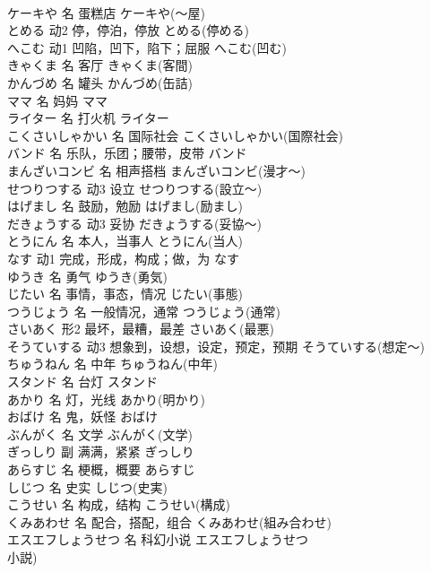 \documentclass[8pt]{extreport}
\begin{document}
\begin{CJK}{UTF8}{min}
\\	ケーキや	名	蛋糕店	ケーキや(～屋)	
\\	とめる	动2	停，停泊，停放	とめる(停める)	
\\	へこむ	动1	凹陷，凹下，陷下；屈服	へこむ(凹む)	
\\	きゃくま	名	客厅	きゃくま(客間)	
\\	かんづめ	名	罐头	かんづめ(缶詰)	
\\	ママ	名	妈妈	ママ	
\\	ライター	名	打火机	ライター	
\\	こくさいしゃかい	名	国际社会	こくさいしゃかい(国際社会)	
\\	バンド	名	乐队，乐团；腰带，皮带	バンド	
\\	まんざいコンビ	名	相声搭档	まんざいコンビ(漫才～)	
\\	せつりつする	动3	设立	せつりつする(設立～)	
\\	はげまし	名	鼓励，勉励	はげまし(励まし)	
\\	だきょうする	动3	妥协	だきょうする(妥協～)	
\\	とうにん	名	本人，当事人	とうにん(当人)	
\\	なす	动1	完成，形成，构成；做，为	なす	
\\	ゆうき	名	勇气	ゆうき(勇気)	
\\	じたい	名	事情，事态，情况	じたい(事態)	
\\	つうじょう	名	一般情况，通常	つうじょう(通常)	
\\	さいあく	形2	最坏，最糟，最差	さいあく(最悪)	
\\	そうていする	动3	想象到，设想，设定，预定，预期	そうていする(想定～)	
\\	ちゅうねん	名	中年	ちゅうねん(中年)	
\\	スタンド	名	台灯	スタンド	
\\	あかり	名	灯，光线	あかり(明かり)	
\\	おばけ	名	鬼，妖怪	おばけ	
\\	ぶんがく	名	文学	ぶんがく(文学)	
\\	ぎっしり	副	满满，紧紧	ぎっしり	
\\	あらすじ	名	梗概，概要	あらすじ	
\\	しじつ	名	史实	しじつ(史実)	
\\	こうせい	名	构成，结构	こうせい(構成)	
\\	くみあわせ	名	配合，搭配，组合	くみあわせ(組み合わせ)	
\\	エスエフしょうせつ	名	科幻小说	エスエフしょうせつ
\\	小説)	

\end{CJK}
\end{document}
